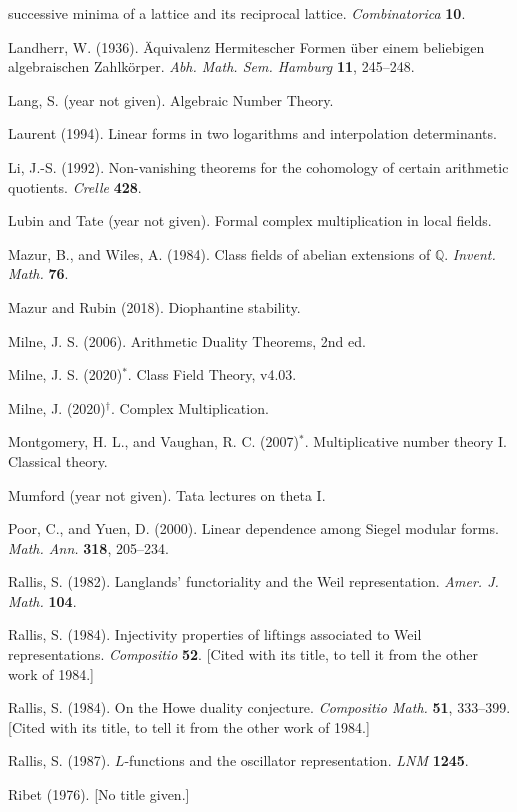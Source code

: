 \begin{list}{}{\setlength{\leftmargin}{1.5em}\setlength{\itemindent}{-1.5em}\setlength{\itemsep}{2pt}\setlength{\parsep}{0pt}}
  successive minima of a lattice and its reciprocal lattice. \emph{Combinatorica} \textbf{10}.
\item Landherr, W. (1936). \"Aquivalenz Hermitescher Formen \"uber einem beliebigen algebraischen
  Zahlk\"orper. \emph{Abh. Math. Sem. Hamburg} \textbf{11}, 245--248.
\item Lang, S. (year not given). Algebraic Number Theory.
\item Laurent (1994). Linear forms in two logarithms and interpolation determinants.
\item Li, J.-S. (1992). Non-vanishing theorems for the cohomology of certain arithmetic quotients.
  \emph{Crelle} \textbf{428}.
\item Lubin and Tate (year not given). Formal complex multiplication in local fields.
\item Mazur, B., and Wiles, A. (1984). Class fields of abelian extensions of $\mathbb{Q}$.
  \emph{Invent. Math.} \textbf{76}.
\item Mazur and Rubin (2018). Diophantine stability.
\item Milne, J. S. (2006). Arithmetic Duality Theorems, 2nd ed.
\item Milne, J. S. (2020)$^*$. Class Field Theory, v4.03.
\item Milne, J. (2020)$^\dagger$. Complex Multiplication.
\item Montgomery, H. L., and Vaughan, R. C. (2007)$^*$. Multiplicative number theory I. Classical
  theory.
\item Mumford (year not given). Tata lectures on theta I.
\item Poor, C., and Yuen, D. (2000). Linear dependence among Siegel modular forms. \emph{Math. Ann.}
  \textbf{318}, 205--234.
\item Rallis, S. (1982). Langlands' functoriality and the Weil representation. \emph{Amer. J. Math.}
  \textbf{104}.
\item Rallis, S. (1984). Injectivity properties of liftings associated to Weil representations.
  \emph{Compositio} \textbf{52}. [Cited with its title, to tell it from the other work of 1984.]
\item Rallis, S. (1984). On the Howe duality conjecture. \emph{Compositio Math.} \textbf{51},
  333--399. [Cited with its title, to tell it from the other work of 1984.]
\item Rallis, S. (1987). $L$-functions and the oscillator representation. \emph{LNM} \textbf{1245}.
\item Ribet (1976). [No title given.]

\end{list}

